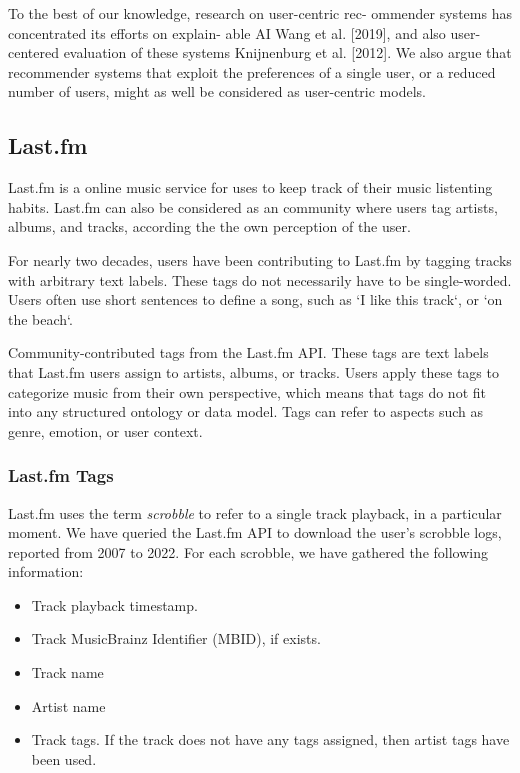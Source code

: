 \documentclass[sn-mathphys]{sn-jnl}%
\theoremstyle{thmstyleone}%
\theoremstyle{thmstyletwo}%
\theoremstyle{thmstylethree}%
\begin{document}
To the best of our knowledge, research on user-centric rec-
ommender systems has concentrated its efforts on explain-
able AI Wang et al. [2019], and also user-centered evaluation
of these systems Knijnenburg et al. [2012]. We also argue
that recommender systems that exploit the preferences of a
single user, or a reduced number of users, might as well be
considered as user-centric models.


\subsection{Last.fm}

Last.fm is a online music service for uses to keep track of their music listenting habits.
Last.fm can also be considered as an community where users tag artists, albums, and tracks, according the the own perception of the user.

For nearly two decades, users have been contributing to Last.fm by tagging tracks with arbitrary text labels.
These tags do not necessarily have to be single-worded.
Users often use short sentences to define a song, such as `I like this track`, or `on the beach`.

Community-contributed tags from the Last.fm API.
These tags are text labels that Last.fm users assign
to artists, albums, or tracks. Users apply these tags to
categorize music from their own perspective, which
means that tags do not fit into any structured ontology
or data model. Tags can refer to aspects such as genre,
emotion, or user context.

\subsubsection{Last.fm Tags}
Last.fm uses the term \emph{scrobble} to refer to a single track playback,
in a particular moment. We have queried the Last.fm
API to download the user{'}s scrobble logs, reported from 2007 to 2022.
For each scrobble, we have gathered the following information:

\begin{itemize}
     \item Track playback timestamp.
     \item Track MusicBrainz Identifier (MBID), if exists.
     \item Track name
     \item Artist name
     \item Track tags. If the track does not have any tags assigned,
      then artist tags have been used.
\end{itemize}
\end{document}
